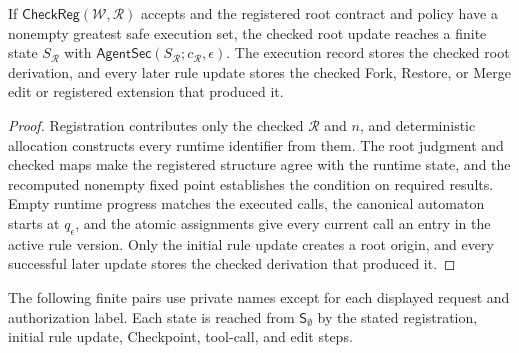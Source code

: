 \begin{lemma}
\label{lem:app-boot}
If \(\mathsf{CheckReg}(\mathcal W,\mathcal R)\) accepts and the registered root contract and policy have a nonempty greatest safe execution set, the checked root update reaches a finite state \(S_{\mathcal R}\) with \(\mathsf{AgentSec}(S_{\mathcal R};c_{\mathcal R},\epsilon)\).
The execution record stores the checked root derivation, and every later rule update stores the checked Fork, Restore, or Merge edit or registered extension that produced it.
\end{lemma}

\begin{proof}
Registration contributes only the checked \(\mathcal R\) and \(n\), and deterministic allocation constructs every runtime identifier from them.
The root judgment and checked maps make the registered structure agree with the runtime state, and the recomputed nonempty fixed point establishes the condition on required results.
Empty runtime progress matches the executed calls, the canonical automaton starts at \(q_\epsilon\), and the atomic assignments give every current call an entry in the active rule version.
Only the initial rule update creates a root origin, and every successful later update stores the checked derivation that produced it.
\end{proof}

The following finite pairs use private names except for each displayed request and authorization label.
Each state is reached from \(\mathsf S_\emptyset\) by the stated registration, initial rule update, Checkpoint, tool-call, and edit steps.

